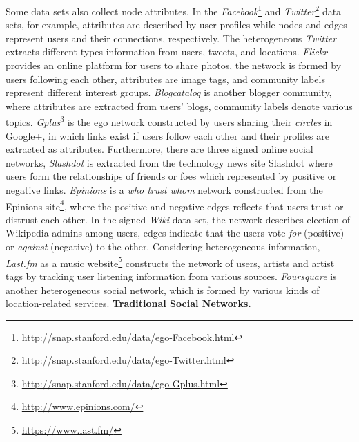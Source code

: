 Some data sets also collect node attributes. In the \textit{Facebook}\footnote{\url{http://snap.stanford.edu/data/ego-Facebook.html}} and \textit{Twitter}\footnote{\url{http://snap.stanford.edu/data/ego-Twitter.html}} data sets, for example, attributes are described by user profiles while nodes and edges represent users and their connections, respectively. The heterogeneous \textit{Twitter} extracts different types information from users, tweets, and locations. \textit{Flickr} provides an online platform for users to share photos, the network is formed by users following each other, attributes are image tags, and community labels represent different interest groups. \textit{Blogcatalog} is another blogger community, where attributes are extracted from users' blogs, community labels denote various topics. \textit{Gplus}\footnote{\url{http://snap.stanford.edu/data/ego-Gplus.html}} is the ego network constructed by users sharing their \textit{circles} in Google+, in which links exist if users follow each other and their profiles are extracted as attributes. Furthermore, there are three signed online social networks, \textit{Slashdot} is extracted from the technology news site Slashdot where users form the relationships of friends or foes which represented by positive or negative links. \textit{Epinions} is a \textit{who trust whom} network constructed from the Epinions site\footnote{\url{http://www.epinions.com/}}, where the positive and negative edges reflects that users trust or distrust each other. In the signed \textit{Wiki} data set, the network describes election of Wikipedia admins among users, edges indicate that the users vote \textit{for} (positive) or \textit{against} (negative) to the other. Considering heterogeneous information, \textit{Last.fm} as a music website\footnote{\url{https://www.last.fm/}} constructs the network of users, artists and artist tags by tracking user listening information from various sources. \textit{Foursquare} is another heterogeneous social network, which is formed by various kinds of location-related services. 
\textbf{Traditional Social Networks.}
